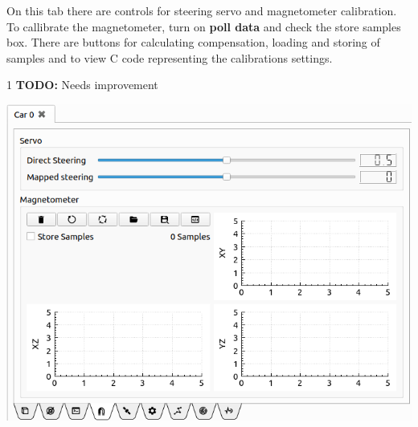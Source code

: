 \documentclass[12pt]{article} %
\def\printtodos{0}
\newcommand{\todo}[1]{
  \if\printtodos1
      {\color{red} \textbf{TODO:} #1}
  \fi}
\begin{document}
\noindent\begin{minipage}{0.5\textwidth} %
 On this tab there are controls for
steering servo and magnetometer calibration.  To callibrate the
magnetometer, turn on {\bf poll data} and check the store samples
box. There are buttons for calculating compensation, loading and
storing of samples and to view C code representing the calibrations
settings.

\todo{Needs improvement}

\end{minipage}
\begin{minipage}{0.5\textwidth}
  \noindent \includegraphics[width=\textwidth]{./screens/Car_calibration.png}
\end{minipage}
\end{document}
